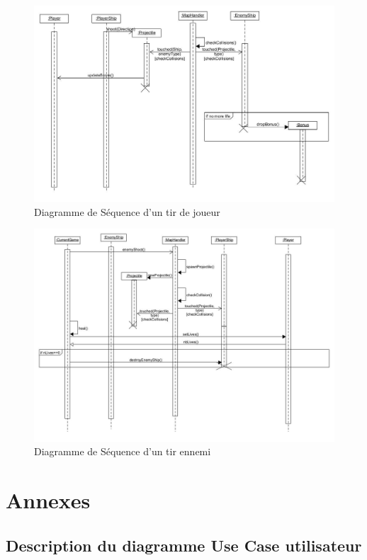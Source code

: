 \documentclass[a4paper,12pt]{article}
\begin{document}
\begin{figure}[hbtp]
\centering
\includegraphics[scale=0.3]{images/player_shooting.jpg}
\caption{Diagramme de Séquence d'un tir de joueur}
\end{figure}


\begin{figure}[hbtp]
\centering
\includegraphics[scale=0.3]{images/enemy_shooting.jpg}
\caption{Diagramme de Séquence d'un tir ennemi }
\end{figure}

\newpage
\section{Annexes}
\subsection{ Description du diagramme Use Case utilisateur}
\end{document}
